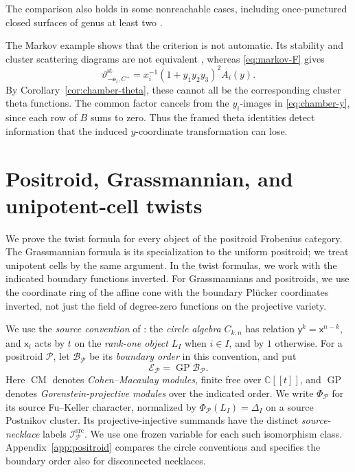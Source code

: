 \documentclass[11pt]{amsart}
\numberwithin{equation}{section}
\theoremstyle{definition}
\theoremstyle{remark}
\newcommand{\op}[1]{\operatorname{#1}}
\newcommand{\E}{\mathcal E}
\newcommand{\Pcal}{\mathcal P}
\newcommand{\CM}{\op{CM}}
\newcommand{\GP}{\op{GP}}
\begin{document}
The comparison also holds in some nonreachable cases, including
once-punctured closed surfaces of genus at least two
\cite[Theorem~1.4]{CMQ24}.

The Markov example shows that the criterion is not automatic. Its
stability and cluster scattering diagrams are not equivalent
\cite[Theorem~1.4]{CMQ24}, whereas \eqref{eq:markov-F} gives
\[ \vartheta^{\mathrm{st}}_{-\mathbf e_i,C^+}=x_i^{-1}(1+y_1y_2y_3)^2A_i(y). \]
By Corollary~\ref{cor:chamber-theta}, these cannot all be the corresponding
cluster theta functions. The common factor cancels from the $y_i$-images
in \eqref{eq:chamber-y}, since each row of $B$ sums to zero. Thus the
framed theta identities detect information that the induced
$y$-coordinate transformation can lose.

\section{Positroid, Grassmannian, and unipotent-cell twists}\label{sec:geometric}

We prove the twist formula for every object of the positroid Frobenius
category. The Grassmannian formula is its specialization to the uniform
positroid; we treat unipotent cells by the same argument.
In the twist formulas, we work with the indicated boundary functions
inverted. For Grassmannians and positroids, we use the coordinate ring
of the affine cone with the boundary Pl\"ucker coordinates inverted,
not just the field of degree-zero functions on the projective variety.

We use the \emph{source convention} of \cite{CKP24,Pre}: the
\emph{circle algebra} $C_{k,n}$ has relation $\mathsf y^k=\mathsf x^{n-k}$, and
$\mathsf x_i$ acts by $t$ on the \emph{rank-one object} $L_I$ when
$i\in I$, and by $1$ otherwise. For a positroid $\Pcal$, let
$\mathcal B_\Pcal$ be its \emph{boundary order} in this convention,
and put
\[ \E_\Pcal=\GP\mathcal B_\Pcal. \]
Here $\CM$ denotes \emph{Cohen--Macaulay modules}, finite free over
$\mathbb C[[t]]$, and $\GP$ denotes \emph{Gorenstein-projective
modules} over the indicated order.
We write $\Phi_\Pcal$ for its source Fu--Keller character, normalized
by $\Phi_\Pcal(L_I)=\Delta_I$ on a source Postnikov cluster.
Its projective-injective summands have the distinct
\emph{source-necklace} labels $\mathcal I^{\mathrm{src}}_\Pcal$.
We use one frozen variable for each such isomorphism class.
Appendix~\ref{app:positroid} compares the circle conventions and specifies
the boundary order also for disconnected necklaces.
\end{document}
